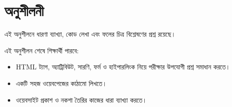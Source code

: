 \section{অনুশীলনী}

এই অনুশীলনে ধারণা ব্যাখ্যা, কোড লেখা এবং ফলের চিত্র বিশ্লেষণের প্রশ্ন রয়েছে।



\begin{learningbox}
এই অনুশীলন শেষে শিক্ষার্থী পারবে:
\begin{itemize}
\item HTML ট্যাগ, অ্যাট্রিবিউট, সারণি, ফর্ম ও হাইপারলিংক নিয়ে পরীক্ষার উপযোগী প্রশ্ন সমাধান করতে।
\item একটি সহজ ওয়েবপেজের কাঠামো লিখতে।
\item ওয়েবসাইট প্রকাশ ও নকশা তৈরির কাজের ধারা ব্যাখ্যা করতে।
\end{itemize}
\end{learningbox}

